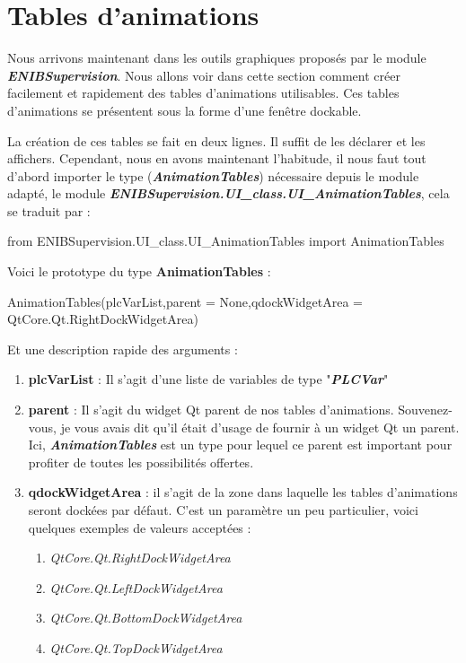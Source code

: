 \documentclass[12pt]{report}    %
\newcommand{\bold}[1]{{\bfseries #1}}
\newcommand{\italic}[1]{{\itshape #1}}
\newcommand{\ib}[1]{{\bfseries\itshape #1}}
\newcommand{\smallSkip}{\vskip 0.5cm}
\begin{document}
\section{Tables d'animations}

Nous arrivons maintenant dans les outils graphiques proposés par le module \ib{ENIBSupervision}.\newline
Nous allons voir dans cette section comment créer facilement et rapidement des tables d'animations utilisables.\newline
Ces tables d'animations se présentent sous la forme d'une fenêtre dockable.\smallSkip

La création de ces tables se fait en deux lignes. Il suffit de les déclarer et les affichers.\newline
Cependant, nous en avons maintenant l'habitude, il nous faut tout d'abord importer le type (\ib{AnimationTables}) nécessaire depuis le module adapté, le module \ib{ENIBSupervision.UI\_class.UI\_AnimationTables}, cela se traduit par :
\begin{pyCode}
from ENIBSupervision.UI_class.UI_AnimationTables import AnimationTables
\end{pyCode}
\smallSkip

Voici le prototype du type \bold{AnimationTables} :
\begin{pyCode}
AnimationTables(plcVarList,parent = None,qdockWidgetArea = QtCore.Qt.RightDockWidgetArea)
\end{pyCode}
Et une description rapide des arguments :
\begin{enumerate}
    \item \bold{plcVarList} : Il s'agit d'une liste de variables de type "\ib{PLCVar}"
    \item \bold{parent} : Il s'agit du widget Qt parent de nos tables d'animations. Souvenez-vous, je vous avais dit qu'il était d'usage de fournir à un widget Qt un parent. Ici, \ib{AnimationTables} est un type pour lequel ce parent est important pour profiter de toutes les possibilités offertes.
    \item \bold{qdockWidgetArea} : il s'agit de la zone dans laquelle les tables d'animations seront dockées par défaut. C'est un paramètre un peu particulier, voici quelques exemples de valeurs acceptées :
    \begin{enumerate}
        \item \italic{QtCore.Qt.RightDockWidgetArea}
        \item \italic{QtCore.Qt.LeftDockWidgetArea}
        \item \italic{QtCore.Qt.BottomDockWidgetArea}
        \item \italic{QtCore.Qt.TopDockWidgetArea}
    \end{enumerate}
\end{enumerate}
\smallSkip
\end{document}
